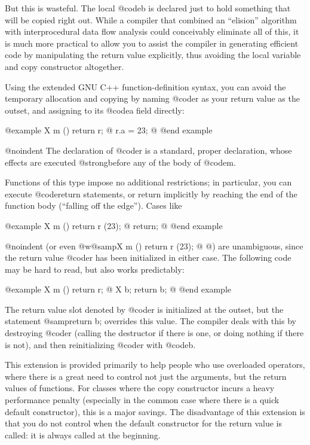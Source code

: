 {{{{{But this is wasteful.  The local @code{b} is declared just to hold
something that will be copied right out.  While a compiler that
combined an ``elision'' algorithm with interprocedural data flow
analysis could conceivably eliminate all of this, it is much more
practical to allow you to assist the compiler in generating
efficient code by manipulating the return value explicitly,
thus avoiding the local variable and copy constructor altogether.

Using the extended GNU C++ function-definition syntax, you can avoid the
temporary allocation and copying by naming @code{r} as your return value
as the outset, and assigning to its @code{a} field directly:

@example
X
m () return r;
@{
  r.a = 23; 
@}
@end example

@noindent
The declaration of @code{r} is a standard, proper declaration, whose effects
are executed @strong{before} any of the body of @code{m}.

Functions of this type impose no additional restrictions; in particular,
you can execute @code{return} statements, or return implicitly by
reaching the end of the function body (``falling off the edge'').
Cases like 

@example
X
m () return r (23);
@{
  return; 
@}
@end example

@noindent
(or even @w{@samp{X m () return r (23); @{ @}}}) are unambiguous, since
the return value @code{r} has been initialized in either case.  The
following code may be hard to read, but also works predictably:

@example
X
m () return r;
@{
  X b;
  return b; 
@}
@end example

The return value slot denoted by @code{r} is initialized at the outset,
but the statement @samp{return b;} overrides this value.  The compiler
deals with this by destroying @code{r} (calling the destructor if there
is one, or doing nothing if there is not), and then reinitializing
@code{r} with @code{b}.

This extension is provided primarily to help people who use overloaded
operators, where there is a great need to control not just the
arguments, but the return values of functions.  For classes where the
copy constructor incurs a heavy performance penalty (especially in the
common case where there is a quick default constructor), this is a major
savings.  The disadvantage of this extension is that you do not control
when the default constructor for the return value is called: it is
always called at the beginning.

}}}}}

